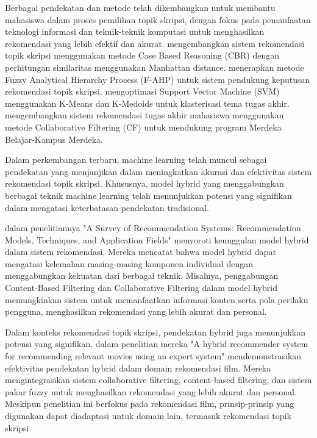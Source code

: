 Berbagai pendekatan dan metode telah dikembangkan untuk membantu mahasiswa dalam proses pemilihan topik skripsi, dengan fokus pada pemanfaatan teknologi informasi dan teknik-teknik komputasi untuk menghasilkan rekomendasi yang lebih efektif dan akurat.\cite{merawati2018sistem} mengembangkan sistem rekomendasi topik skripsi menggunakan metode Case Based Reasoning (CBR) dengan perhitungan similaritas menggunakan Manhattan distance. \cite{abdullah2021sistem} menerapkan metode Fuzzy Analytical Hierarchy Process (F-AHP) untuk sistem pendukung keputusan rekomendasi topik skripsi. \cite{patria2022optimasi} mengoptimasi Support Vector Machine (SVM) menggunakan K-Means dan K-Medoids untuk klasterisasi tema tugas akhir. \cite{salam2022sistem} mengembangkan sistem rekomendasi tugas akhir mahasiswa menggunakan metode Collaborative Filtering (CF) untuk mendukung program Merdeka Belajar-Kampus Merdeka.

Dalam perkembangan terbaru, machine learning telah muncul sebagai pendekatan yang menjanjikan dalam meningkatkan akurasi dan efektivitas sistem rekomendasi topik skripsi. Khususnya, model hybrid yang menggabungkan berbagai teknik machine learning telah menunjukkan potensi yang signifikan dalam mengatasi keterbatasan pendekatan tradisional.

\cite{Ko2022} dalam penelitiannya "A Survey of Recommendation Systems: Recommendation Models, Techniques, and Application Fields" menyoroti keunggulan model hybrid dalam sistem rekomendasi. Mereka mencatat bahwa model hybrid dapat mengatasi kelemahan masing-masing komponen individual dengan menggabungkan kekuatan dari berbagai teknik. Misalnya, penggabungan Content-Based Filtering dan Collaborative Filtering dalam model hybrid memungkinkan sistem untuk memanfaatkan informasi konten serta pola perilaku pengguna, menghasilkan rekomendasi yang lebih akurat dan personal.

Dalam konteks rekomendasi topik skripsi, pendekatan hybrid juga menunjukkan potensi yang signifikan. \cite{walek2020hybrid} dalam penelitian mereka "A hybrid recommender system for recommending relevant movies using an expert system" mendemonstrasikan efektivitas pendekatan hybrid dalam domain rekomendasi film. Mereka mengintegrasikan sistem collaborative filtering, content-based filtering, dan sistem pakar fuzzy untuk menghasilkan rekomendasi yang lebih akurat dan personal. Meskipun penelitian ini berfokus pada rekomendasi film, prinsip-prinsip yang digunakan dapat diadaptasi untuk domain lain, termasuk rekomendasi topik skripsi.

